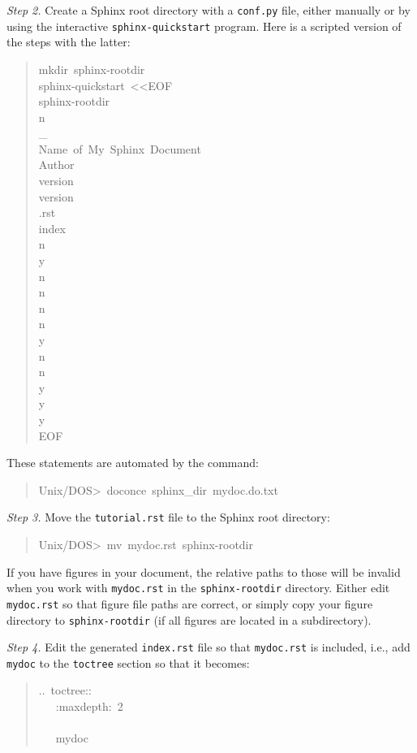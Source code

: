 \documentclass[a4paper,english]{article}
\begin{document}
\emph{Step 2.} Create a Sphinx root directory with a \texttt{conf.py} file,
either manually or by using the interactive \texttt{sphinx-quickstart}
program. Here is a scripted version of the steps with the latter:
%
\begin{quote}{\ttfamily \raggedright \noindent
mkdir~sphinx-rootdir\\
sphinx-quickstart~<{}<EOF\\
sphinx-rootdir\\
n\\
\_\\
Name~of~My~Sphinx~Document\\
Author\\
version\\
version\\
.rst\\
index\\
n\\
y\\
n\\
n\\
n\\
n\\
y\\
n\\
n\\
y\\
y\\
y\\
EOF
}
\end{quote}

These statements are automated by the command:
%
\begin{quote}{\ttfamily \raggedright \noindent
Unix/DOS>~doconce~sphinx\_dir~mydoc.do.txt
}
\end{quote}

\emph{Step 3.} Move the \texttt{tutorial.rst} file to the Sphinx root directory:
%
\begin{quote}{\ttfamily \raggedright \noindent
Unix/DOS>~mv~mydoc.rst~sphinx-rootdir
}
\end{quote}

If you have figures in your document, the relative paths to those will
be invalid when you work with \texttt{mydoc.rst} in the \texttt{sphinx-rootdir}
directory. Either edit \texttt{mydoc.rst} so that figure file paths are correct,
or simply copy your figure directory to \texttt{sphinx-rootdir} (if all figures
are located in a subdirectory).

\emph{Step 4.} Edit the generated \texttt{index.rst} file so that \texttt{mydoc.rst}
is included, i.e., add \texttt{mydoc} to the \texttt{toctree} section so that it becomes:
%
\begin{quote}{\ttfamily \raggedright \noindent
..~toctree::\\
~~~:maxdepth:~2\\
~\\
~~~mydoc
}
\end{quote}
\end{document}

